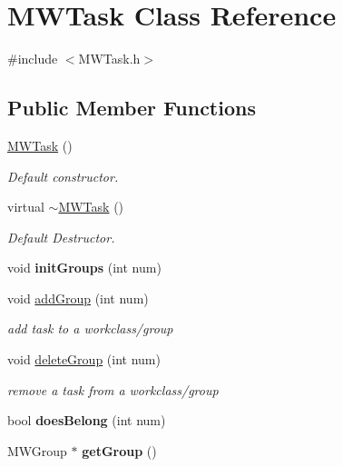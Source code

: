 \hypertarget{classMWTask}{}\section{M\+W\+Task Class Reference}
\label{classMWTask}


{\ttfamily \#include $<$M\+W\+Task.\+h$>$}

\subsection*{Public Member Functions}
\begin{DoxyCompactItemize}
\item 
\mbox{\label{classMWTask_a453c3200a67ca95ea23dcd284dfff111}} 
\hyperlink{classMWTask_a453c3200a67ca95ea23dcd284dfff111}{M\+W\+Task} ()
\begin{DoxyCompactList}\small\item\em Default constructor. \end{DoxyCompactList}\item 
\mbox{\label{classMWTask_ad8f7b5699465d56fa17b70f40e2d3047}} 
virtual \hyperlink{classMWTask_ad8f7b5699465d56fa17b70f40e2d3047}{$\sim$\+M\+W\+Task} ()
\begin{DoxyCompactList}\small\item\em Default Destructor. \end{DoxyCompactList}\item 
\mbox{\label{classMWTask_ad84173b0428ecbb311fd33b11296ef28}} 
void {\bfseries init\+Groups} (int num)
\item 
\mbox{\label{classMWTask_a97ee3d8338dd2e02a20631e2e595f237}} 
void \hyperlink{classMWTask_a97ee3d8338dd2e02a20631e2e595f237}{add\+Group} (int num)
\begin{DoxyCompactList}\small\item\em add task to a workclass/group \end{DoxyCompactList}\item 
\mbox{\label{classMWTask_a918669fb822fed85add7b5ca3b8aeafe}} 
void \hyperlink{classMWTask_a918669fb822fed85add7b5ca3b8aeafe}{delete\+Group} (int num)
\begin{DoxyCompactList}\small\item\em remove a task from a workclass/group \end{DoxyCompactList}\item 
\mbox{\label{classMWTask_a563d96a457f11a0d2d2d87033f6ee611}} 
bool {\bfseries does\+Belong} (int num)
\item 
\mbox{\label{classMWTask_a69a7787e65fbf28bfb782208566a32a6}} 
M\+W\+Group $\ast$ {\bfseries get\+Group} ()
\end{DoxyCompactItemize}

